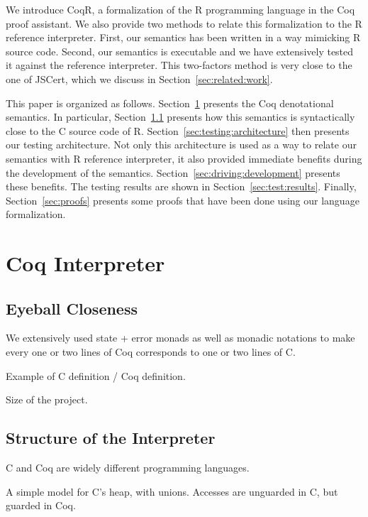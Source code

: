 \documentclass[
    sigplan,
    10pt,
    review, %
    natbib=false %
 ]{acmart}
\newcommand{\mb}[1]{\todo[color=purple!20,size=\scriptsize]{#1}}
\begin{document}
We introduce CoqR\mb{Are we fixed on the name? ☺},
a formalization of the R programming language in the Coq proof assistant.
We also provide two methods to relate this formalization
to the R reference interpreter.
First, our semantics has been written in a way mimicking R source code.
Second, our semantics is executable and we have extensively tested it
against the reference interpreter.
%
This two-factors method is very close to the one of JSCert,
which we discuss in Section~\ref{sec:related:work}.

This paper is organized as follows.
Section~\ref{sec:coq:interp} presents the Coq denotational semantics.
In particular, Section~\ref{sec:eyeball:closeness} presents
how this semantics is syntactically close to the C source code of R.
Section~\ref{sec:testing:architecture} then presents our testing architecture.
Not only this architecture is used as a way to relate our semantics
with R reference interpreter,
it also provided immediate benefits during the development of the semantics.
Section~\ref{sec:driving:development} presents these benefits.
The testing results are shown in Section~\ref{sec:test:results}.
Finally, Section~\ref{sec:proofs} presents some proofs that have been done
using our language formalization.

\section{Coq Interpreter}
\label{sec:coq:interp}

\subsection{Eyeball Closeness}
\label{sec:eyeball:closeness}

We extensively used state + error monads as well as monadic notations
to make every one or two lines of Coq corresponds to one or two lines of C.

Example of C definition / Coq definition.

Size of the project.

\subsection{Structure of the Interpreter}
\label{sec:coq:structure}

C and Coq are widely different programming languages.

A simple model for C’s heap, with unions.
Accesses are unguarded in C, but guarded in Coq.
\end{document}
